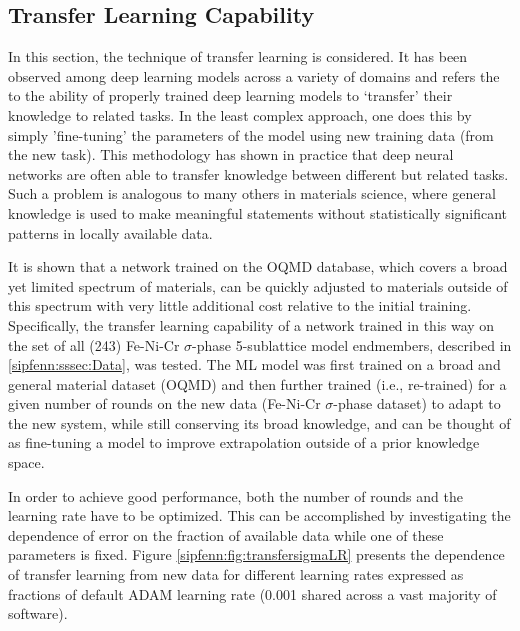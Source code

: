 \subsection{Transfer Learning Capability} \label{sipfenn:ssec:transferlearningresults}
In this section, the technique of transfer learning is considered. It has been observed among deep learning models across a variety of domains \cite{tan2018survey,cirecsan2012transfer,chang2017unsupervised,george2018deep} and refers the to the ability of properly trained deep learning models to `transfer' their knowledge to related tasks. In the least complex approach, one does this by simply 'fine-tuning' the parameters of the model using new training data (from the new task). This methodology has shown in practice that deep neural networks are often able to transfer knowledge between different but related tasks. Such a problem is analogous to many others in materials science, where general knowledge is used to make meaningful statements without statistically significant patterns in locally available data. 

It is shown that a network trained on the OQMD database, which covers a broad yet limited spectrum of materials, can be quickly adjusted to materials outside of this spectrum with very little additional cost relative to the initial training. Specifically, the transfer learning capability of a network trained in this way on the set of all (243) Fe-Ni-Cr $\sigma$-phase 5-sublattice model endmembers, described in \ref{sipfenn:sssec:Data}, was tested. The ML model was first trained on a broad and general material dataset (OQMD) and then further trained (i.e., re-trained) for a given number of rounds on the new data (Fe-Ni-Cr $\sigma$-phase dataset) to adapt to the new system, while still conserving its broad knowledge, and can be thought of as fine-tuning a model to improve extrapolation outside of a prior knowledge space. 

In order to achieve good performance, both the number of rounds and the learning rate have to be optimized. This can be accomplished by investigating the dependence of error on the fraction of available data while one of these parameters is fixed. Figure \ref{sipfenn:fig:transfersigmaLR} presents the dependence of transfer learning from new data for different learning rates expressed as fractions of default ADAM learning rate (0.001 shared across a vast majority of software). 

